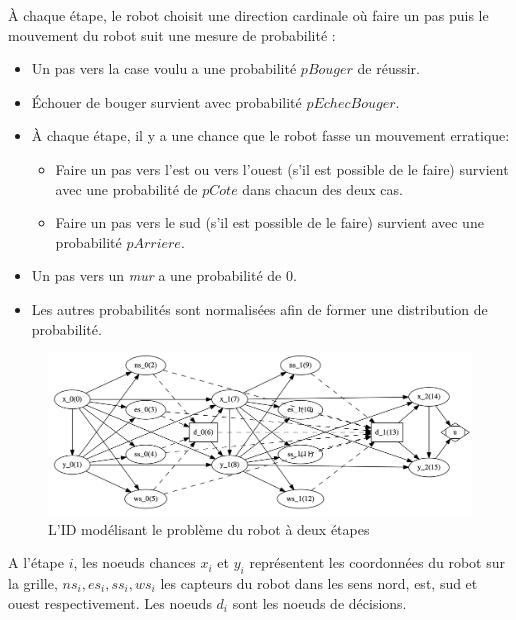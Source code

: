 \documentclass[12pt]{article}
\begin{document}
À chaque étape, le robot choisit une direction cardinale où faire un pas puis le mouvement du robot suit une mesure de probabilité :
\begin{itemize}
  \item Un pas vers la case voulu a une probabilité $pBouger$ de réussir.
  \item Échouer de bouger survient avec probabilité $pEchecBouger$.
  \item À chaque étape, il y a une chance que le robot fasse un mouvement erratique:
  \begin{itemize}
        \item Faire un pas vers l'est ou vers l'ouest (s'il est possible de le faire) survient avec une probabilité de $pCote$ dans chacun des deux cas.
        \item Faire un pas vers le sud (s'il est possible de le faire) survient avec une probabilité $pArriere$.
        \end{itemize}
  \item Un pas vers un \textit{mur} a une probabilité de 0.
  \item Les autres probabilités sont normalisées afin de former une distribution de probabilité.
\end{itemize}
\begin{figure}[h]
\centering
\includegraphics[scale=0.32]{docs/IDROBOT.png}
\caption{L'ID modélisant le problème du robot à deux étapes }
\end{figure}
A l'étape $i$, les noeuds chances $x_i$ et $y_i$ représentent les coordonnées du robot sur la grille, $ns_i, es_i, ss_i, ws_i$ les capteurs du robot dans les sens nord, est, sud et ouest respectivement. Les noeuds $d_i$ sont les noeuds de décisions.
\end{document}
